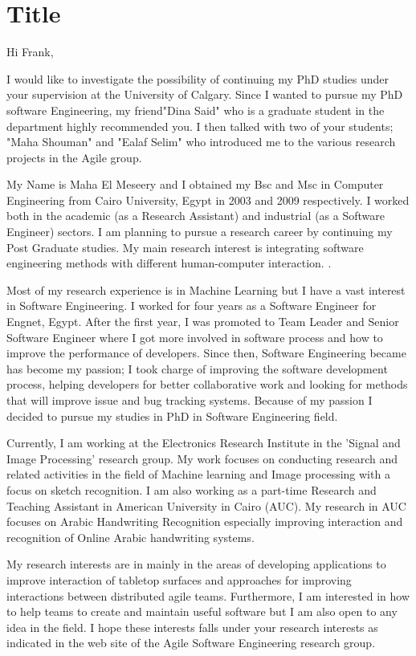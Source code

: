 \documentclass{article}
\begin{document}
\section{Title}


Hi Frank,

I would like to investigate the possibility of continuing my PhD studies under your supervision at the University of Calgary. Since I wanted to pursue my PhD software Engineering, my friend"Dina Said" who is a graduate student in the department highly recommended you. I then talked with two of your students; "Maha Shouman" and "Ealaf Selim" who introduced me to the various research projects in the Agile group.

 My Name is Maha El Meseery and I obtained my Bsc and Msc in Computer Engineering from Cairo University, Egypt in 2003 and 2009 respectively. I worked both in the academic (as a Research Assistant) and industrial (as a Software Engineer) sectors. I am planning to pursue a research career by continuing my Post Graduate studies. My main research interest is integrating software engineering methods with different human-computer interaction.
.

Most of my research experience is in Machine Learning but I have a vast interest
in Software Engineering. I worked for four years as a Software Engineer for Engnet, Egypt. After the first year, I was promoted to Team Leader and Senior Software Engineer where I got more involved in software process and how to improve the performance of developers. Since then, Software Engineering became has become my passion; I took charge of improving the software development process, helping developers for better collaborative work and looking for methods that will improve issue and bug tracking systems. Because of my passion I decided to pursue my studies in PhD in Software Engineering field.


Currently, I am working at the Electronics Research Institute in the 'Signal and Image Processing' research group. My work focuses on conducting research and related activities in the field of Machine learning and Image processing with a focus on sketch recognition. I am also working as a part-time Research and Teaching Assistant in American University in Cairo (AUC). My research in AUC focuses on Arabic Handwriting Recognition especially improving interaction and recognition of Online Arabic handwriting systems.


My research interests are in mainly in the areas of developing applications to improve interaction of tabletop surfaces and approaches for improving interactions between distributed agile teams. Furthermore, I am interested in how to help teams to create and maintain useful software but I am also open to any idea in the field. I hope these interests falls under your research interests as indicated in the web site of the Agile Software Engineering research group.
\end{document}
